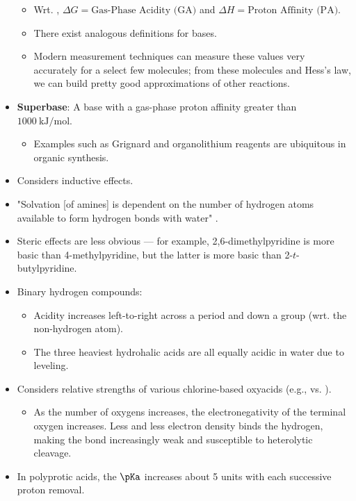 \documentclass[../notes.tex]{subfiles}
\begin{document}
\begin{itemize}
    \begin{itemize}
        \item Wrt. , $\Delta G=\text{Gas-Phase Acidity (GA)}$ and $\Delta H=\text{Proton Affinity (PA)}$.
        \item There exist analogous definitions for bases.
        \item Modern measurement techniques can measure these values very accurately for a select few molecules; from these molecules and Hess's law, we can build pretty good approximations of other reactions.
    \end{itemize}
    \item \textbf{Superbase}: A base with a gas-phase proton affinity greater than $\SI{1000}{\kilo\joule\per\mole}$.
    \begin{itemize}
        \item Examples such as Grignard and organolithium reagents are ubiquitous in organic synthesis.
    \end{itemize}
    \item Considers inductive effects.
    \item "Solvation [of amines] is dependent on the number of hydrogen atoms available to form  hydrogen bonds with water" \parencite[181]{bib:MiesslerFischerTarr}.
    \item Steric effects are less obvious --- for example, 2,6-dimethylpyridine is more basic than 4-methylpyridine, but the latter is more basic than 2-$t$-butylpyridine.
    \item Binary hydrogen compounds:
    \begin{itemize}
        \item Acidity increases left-to-right across a period and down a group (wrt. the non-hydrogen atom).
        \item The three heaviest hydrohalic acids are all equally acidic in water due to leveling.
    \end{itemize}
    \item Considers relative strengths of various chlorine-based oxyacids (e.g.,  vs. ).
    \begin{itemize}
        \item As the number of oxygens increases, the electronegativity of the terminal oxygen increases. Less and less electron density binds the hydrogen, making the bond increasingly weak and susceptible to heterolytic cleavage.
    \end{itemize}
    \item In polyprotic acids, the $\pKa$ increases about 5 units with each successive proton removal.

\end{itemize}
\end{document}
